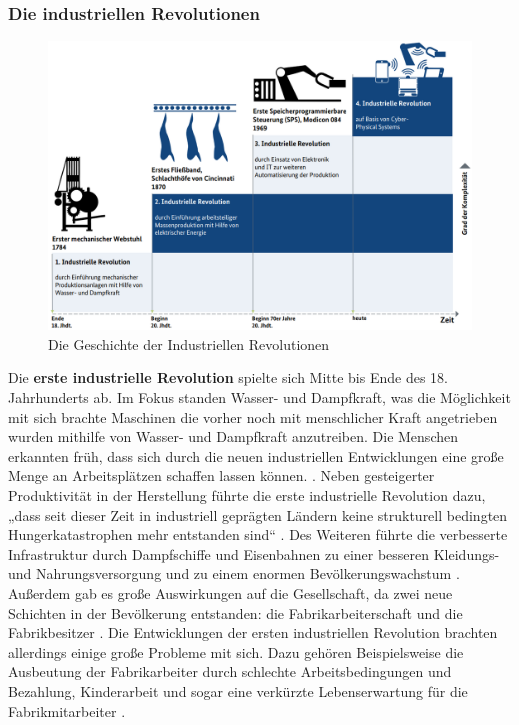\subsubsection{Die industriellen Revolutionen}\label{sec:IndustrielleRevolution}
\begin{figure}[h]
	\centering
	\includegraphics[width=1\linewidth]{Bilder/A1_DieGeschichteDerIndustriellenRevolutionenBMWI}
	\caption{Die Geschichte der Industriellen Revolutionen \cite[S.8]{A1}}
	\label{fig:IndustrielleRevolutionenBild}
\end{figure}
\FloatBarrier
\noindent Die \textbf{erste industrielle Revolution} spielte sich Mitte bis Ende des 18. Jahrhunderts ab. Im Fokus standen Wasser- und Dampfkraft, was die Möglichkeit mit sich brachte Maschinen die vorher noch mit menschlicher Kraft angetrieben wurden mithilfe von Wasser- und Dampfkraft anzutreiben. Die Menschen erkannten früh, dass sich durch die neuen industriellen Entwicklungen eine große Menge an Arbeitsplätzen schaffen lassen können. \cite{9}. Neben gesteigerter Produktivität in der Herstellung führte die erste industrielle Revolution dazu, „dass seit dieser Zeit in industriell geprägten Ländern keine strukturell bedingten Hungerkatastrophen mehr entstanden sind“ \cite[S.5]{15}. Des Weiteren führte die verbesserte Infrastruktur durch Dampfschiffe und Eisenbahnen zu einer besseren Kleidungs- und Nahrungsversorgung und zu einem enormen Bevölkerungswachstum \cite[S.5]{15}. Außerdem gab es große Auswirkungen auf die Gesellschaft, da zwei neue Schichten in der Bevölkerung entstanden: die Fabrikarbeiterschaft und die Fabrikbesitzer \cite[S.5]{15}. Die Entwicklungen der ersten industriellen Revolution brachten allerdings einige große Probleme mit sich. Dazu gehören Beispielsweise die Ausbeutung der Fabrikarbeiter durch schlechte Arbeitsbedingungen und Bezahlung, Kinderarbeit und sogar eine verkürzte Lebenserwartung für die Fabrikmitarbeiter \cite[S.5]{15}.
